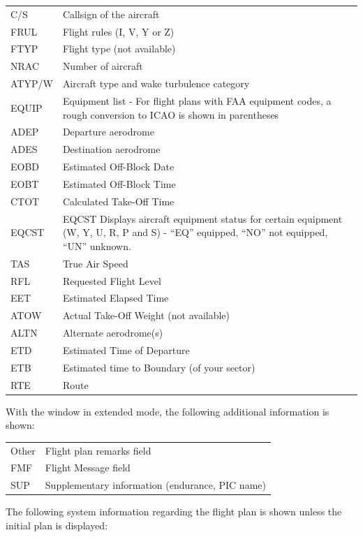 \documentclass[a4paper,oneside,11pt]{memoir}
\begin{document}
\begin{longtable}{p{2.5cm} p{10cm}}
    C/S     & Callsign of the aircraft\\
    FRUL    & Flight rules (I, V, Y or Z)\\
    FTYP    & Flight type (not available)\\
    NRAC    & Number of aircraft\\
    ATYP/W  & Aircraft type and wake turbulence category\\
    EQUIP   & Equipment list - For flight plans with FAA equipment codes, a rough conversion to ICAO is shown in parentheses\\
    ADEP    & Departure aerodrome\\
    ADES    & Destination aerodrome\\
    EOBD    & Estimated Off-Block Date\\
    EOBT    & Estimated Off-Block Time\\
    CTOT    & Calculated Take-Off Time\\
    EQCST   & EQCST Displays aircraft equipment status for certain equipment (W, Y, U, R, P and S) - “EQ” equipped, “NO” not equipped, “UN” unknown.\\
    TAS     & True Air Speed\\
    RFL     & Requested Flight Level\\
    EET     & Estimated Elapsed Time\\
    ATOW    & Actual Take-Off Weight (not available)\\
    ALTN    & Alternate aerodrome(s)\\
    ETD     & Estimated Time of Departure\\
    ETB     & Estimated time to Boundary (of your sector)\\
    RTE     & Route\\
\end{longtable}

With the window in extended mode, the following additional information is shown:

\begin{longtable}{p{2.5cm} p{10cm}}  
  Other     & Flight plan remarks field\\
  FMF       & Flight Message field\\
  SUP       & Supplementary information (endurance, PIC name)\\
\end{longtable}

The following system information regarding the flight plan is shown unless the initial plan is displayed:
\end{document}
